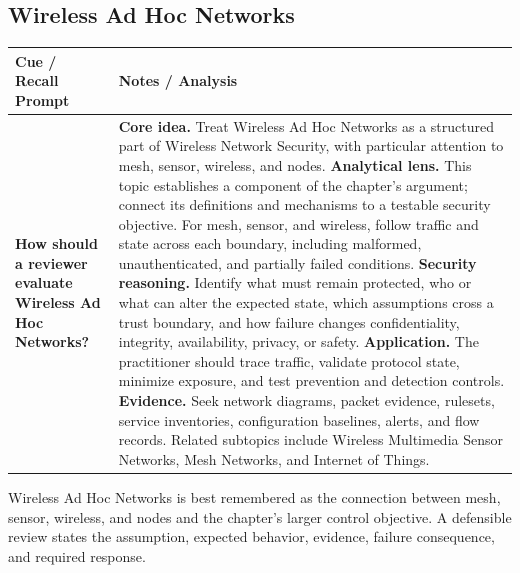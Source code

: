 \documentclass[11pt]{article}
\newcommand{\CornellHeader}{%
\rowcolor{Navy}\color{white}\bfseries Cue / Recall Prompt & \color{white}\bfseries Notes / Analysis\\\hline}
\newcommand{\CornellRow}[2]{%
\cellcolor{CueGray}\RaggedRight\textbf{#1} & \RaggedRight #2\\\hline}
\begin{document}
\subsection*{Wireless Ad Hoc Networks}
\begin{longtable}{>{\RaggedRight\arraybackslash}p{}|>{\RaggedRight\arraybackslash}p{}}
\CornellHeader
\CornellRow{How should a reviewer evaluate Wireless Ad Hoc Networks?}{\textbf{Core idea.} Treat Wireless Ad Hoc Networks as a structured part of Wireless Network Security, with particular attention to mesh, sensor, wireless, and nodes. \textbf{Analytical lens.} This topic establishes a component of the chapter's argument; connect its definitions and mechanisms to a testable security objective. For mesh, sensor, and wireless, follow traffic and state across each boundary, including malformed, unauthenticated, and partially failed conditions. \textbf{Security reasoning.} Identify what must remain protected, who or what can alter the expected state, which assumptions cross a trust boundary, and how failure changes confidentiality, integrity, availability, privacy, or safety. \textbf{Application.} The practitioner should trace traffic, validate protocol state, minimize exposure, and test prevention and detection controls. \textbf{Evidence.} Seek network diagrams, packet evidence, rulesets, service inventories, configuration baselines, alerts, and flow records. Related subtopics include Wireless Multimedia Sensor Networks, Mesh Networks, and Internet of Things.}
\end{longtable}
\begin{topicsummary}
Wireless Ad Hoc Networks is best remembered as the connection between mesh, sensor, wireless, and nodes and the chapter's larger control objective. A defensible review states the assumption, expected behavior, evidence, failure consequence, and required response.
\end{topicsummary}
\end{document}
